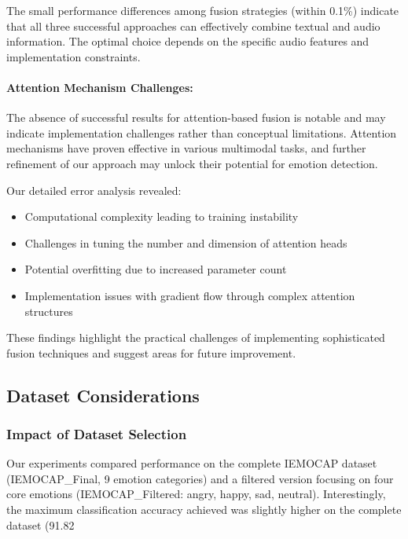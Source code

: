 \documentclass[12pt]{article}
\begin{document}
The small performance differences among fusion strategies (within 0.1\%) indicate that all three successful approaches can effectively combine textual and audio information. The optimal choice depends on the specific audio features and implementation constraints.

\paragraph{Attention Mechanism Challenges:}
The absence of successful results for attention-based fusion is notable and may indicate implementation challenges rather than conceptual limitations. Attention mechanisms have proven effective in various multimodal tasks, and further refinement of our approach may unlock their potential for emotion detection.

Our detailed error analysis revealed:

\begin{itemize}
    \item Computational complexity leading to training instability
    \item Challenges in tuning the number and dimension of attention heads
    \item Potential overfitting due to increased parameter count
    \item Implementation issues with gradient flow through complex attention structures
\end{itemize}

These findings highlight the practical challenges of implementing sophisticated fusion techniques and suggest areas for future improvement.

\subsection{Dataset Considerations}

\subsubsection{Impact of Dataset Selection}
Our experiments compared performance on the complete IEMOCAP dataset (IEMOCAP\_Final, 9 emotion categories) and a filtered version focusing on four core emotions (IEMOCAP\_Filtered: angry, happy, sad, neutral). Interestingly, the maximum classification accuracy achieved was slightly higher on the complete dataset (91.82%
\end{document}
